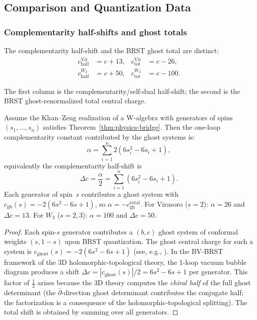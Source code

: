 \subsection{Comparison and Quantization Data}

\subsubsection{Complementarity half-shifts and ghost totals}

The complementarity half-shift and the BRST ghost total are distinct:
\begin{align}
c_{\mathrm{half}}^{\mathrm{Vir}} &= c + 13, &
c_{\mathrm{tot}}^{\mathrm{Vir}} &= c - 26,\\
c_{\mathrm{half}}^{W_3} &= c + 50, &
c_{\mathrm{tot}}^{W_3} &= c - 100.
\end{align}

The first column is the complementarity/self-dual half-shift; the
second is the BRST ghost-renormalized total central charge.

\begin{theorem}
Assume the Khan--Zeng realization of a W-algebra with generators of
spins $(s_1, \ldots, s_n)$ satisfies
Theorem~\ref{thm:physics-bridge}. Then the one-loop complementarity
constant contributed by the ghost systems is:
\begin{equation}
\alpha = \sum_{i=1}^n 2(6s_i^2 - 6s_i + 1),
\end{equation}
equivalently the complementarity half-shift is
\[
\Delta c = \frac{\alpha}{2}
= \sum_{i=1}^n (6s_i^2 - 6s_i + 1).
\]
Each generator of spin~$s$ contributes a ghost system with
$c_{\mathrm{gh}}(s) = -2(6s^2 - 6s + 1)$, so
$\alpha = -c_{\mathrm{gh}}^{\mathrm{total}}$.
For Virasoro ($s=2$): $\alpha = 26$ and $\Delta c = 13$.
For $W_3$ ($s=2,3$): $\alpha = 100$ and $\Delta c = 50$.
\end{theorem}

\begin{proof}
Each spin-$s$ generator contributes a $(b,c)$ ghost system of conformal weights $(s, 1-s)$ upon BRST quantization. The ghost central charge for such a system is $c_{\text{ghost}}(s) = -2(6s^2 - 6s + 1)$ (see, e.g., \cite{FMS86,Pol98}). In the BV-BRST framework of the 3D holomorphic-topological theory, the 1-loop vacuum bubble diagram produces a shift $\Delta c = |c_{\text{ghost}}(s)|/2 = 6s^2 - 6s + 1$ per generator. This factor of $\tfrac{1}{2}$ arises because the 3D theory computes the \emph{chiral half} of the full ghost determinant (the $\bar\partial$-direction ghost determinant contributes the conjugate half; the factorization is a consequence of the holomorphic-topological splitting). The total shift is obtained by summing over all generators.
\end{proof}

